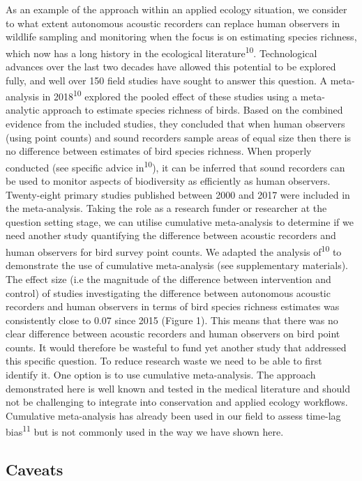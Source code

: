 \documentclass[]{article}
\begin{document}
As an example of the approach within an applied ecology situation, we
consider to what extent autonomous acoustic recorders can replace human
observers in wildlife sampling and monitoring when the focus is on
estimating species richness, which now has a long history in the
ecological literature\textsuperscript{10}. Technological advances over
the last two decades have allowed this potential to be explored fully,
and well over 150 field studies have sought to answer this question. A
meta-analysis in 2018\textsuperscript{10} explored the pooled effect of
these studies using a meta-analytic approach to estimate species
richness of birds. Based on the combined evidence from the included
studies, they concluded that when human observers (using point counts)
and sound recorders sample areas of equal size then there is no
difference between estimates of bird species richness. When properly
conducted (see specific advice in\textsuperscript{10}), it can be
inferred that sound recorders can be used to monitor aspects of
biodiversity as efficiently as human observers. Twenty-eight primary
studies published between 2000 and 2017 were included in the
meta-analysis. Taking the role as a research funder or researcher at the
question setting stage, we can utilise cumulative meta-analysis to
determine if we need another study quantifying the difference between
acoustic recorders and human observers for bird survey point counts. We
adapted the analysis of\textsuperscript{10} to demonstrate the use of
cumulative meta-analysis (see supplementary materials). The effect size
(i.e the magnitude of the difference between intervention and control)
of studies investigating the difference between autonomous acoustic
recorders and human observers in terms of bird species richness
estimates was consistently close to 0.07 since 2015 (Figure 1). This
means that there was no clear difference between acoustic recorders and
human observers on bird point counts. It would therefore be wasteful to
fund yet another study that addressed this specific question. To reduce
research waste we need to be able to first identify it. One option is to
use cumulative meta-analysis. The approach demonstrated here is well
known and tested in the medical literature and should not be challenging
to integrate into conservation and applied ecology workflows. Cumulative
meta-analysis has already been used in our field to assess time-lag
bias\textsuperscript{11} but is not commonly used in the way we have
shown here.

\hypertarget{caveats}{%
\subsection{Caveats}\label{caveats}}
\end{document}
